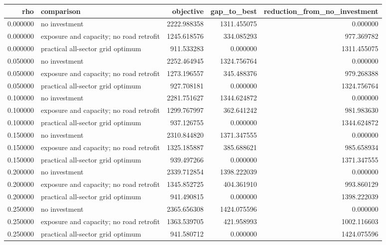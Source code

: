 \begin{tabular}{rlrrr}
\toprule
rho & comparison & objective & gap\_to\_best & reduction\_from\_no\_investment \\
\midrule
0.000000 & no investment & 2222.988358 & 1311.455075 & 0.000000 \\
0.000000 & exposure and capacity; no road retrofit & 1245.618576 & 334.085293 & 977.369782 \\
0.000000 & practical all-sector grid optimum & 911.533283 & 0.000000 & 1311.455075 \\
0.050000 & no investment & 2252.464945 & 1324.756764 & 0.000000 \\
0.050000 & exposure and capacity; no road retrofit & 1273.196557 & 345.488376 & 979.268388 \\
0.050000 & practical all-sector grid optimum & 927.708181 & 0.000000 & 1324.756764 \\
0.100000 & no investment & 2281.751627 & 1344.624872 & 0.000000 \\
0.100000 & exposure and capacity; no road retrofit & 1299.767997 & 362.641242 & 981.983630 \\
0.100000 & practical all-sector grid optimum & 937.126755 & 0.000000 & 1344.624872 \\
0.150000 & no investment & 2310.844820 & 1371.347555 & 0.000000 \\
0.150000 & exposure and capacity; no road retrofit & 1325.185887 & 385.688621 & 985.658934 \\
0.150000 & practical all-sector grid optimum & 939.497266 & 0.000000 & 1371.347555 \\
0.200000 & no investment & 2339.712854 & 1398.222039 & 0.000000 \\
0.200000 & exposure and capacity; no road retrofit & 1345.852725 & 404.361910 & 993.860129 \\
0.200000 & practical all-sector grid optimum & 941.490815 & 0.000000 & 1398.222039 \\
0.250000 & no investment & 2365.656308 & 1424.075596 & 0.000000 \\
0.250000 & exposure and capacity; no road retrofit & 1363.539705 & 421.958993 & 1002.116603 \\
0.250000 & practical all-sector grid optimum & 941.580712 & 0.000000 & 1424.075596 \\
\bottomrule
\end{tabular}

